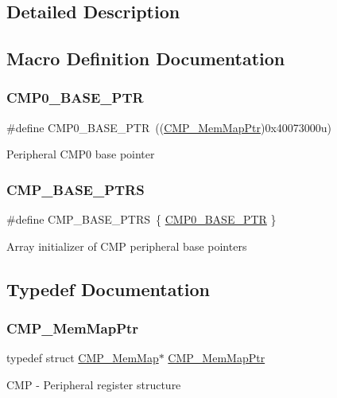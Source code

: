 \subsection{Detailed Description}


\subsection{Macro Definition Documentation}
\mbox{\label{group___c_m_p___peripheral_ga5a7a6b1d0743a05435ba5cb2dc2b3431}} 
\subsubsection{\texorpdfstring{C\+M\+P0\+\_\+\+B\+A\+S\+E\+\_\+\+P\+TR}{CMP0\_BASE\_PTR}}
{\footnotesize\ttfamily \#define C\+M\+P0\+\_\+\+B\+A\+S\+E\+\_\+\+P\+TR~((\hyperlink{group___c_m_p___peripheral_ga6f5d370df3839e41b771c2d0b89cbb83}{C\+M\+P\+\_\+\+Mem\+Map\+Ptr})0x40073000u)}

Peripheral C\+M\+P0 base pointer \mbox{\label{group___c_m_p___peripheral_gacc69654296499d45b2060956a3c8e97f}} 
\subsubsection{\texorpdfstring{C\+M\+P\+\_\+\+B\+A\+S\+E\+\_\+\+P\+T\+RS}{CMP\_BASE\_PTRS}}
{\footnotesize\ttfamily \#define C\+M\+P\+\_\+\+B\+A\+S\+E\+\_\+\+P\+T\+RS~\{ \hyperlink{group___c_m_p___peripheral_ga5a7a6b1d0743a05435ba5cb2dc2b3431}{C\+M\+P0\+\_\+\+B\+A\+S\+E\+\_\+\+P\+TR} \}}

Array initializer of C\+MP peripheral base pointers 

\subsection{Typedef Documentation}
\mbox{\label{group___c_m_p___peripheral_ga6f5d370df3839e41b771c2d0b89cbb83}} 
\subsubsection{\texorpdfstring{C\+M\+P\+\_\+\+Mem\+Map\+Ptr}{CMP\_MemMapPtr}}
{\footnotesize\ttfamily typedef struct \hyperlink{struct_c_m_p___mem_map}{C\+M\+P\+\_\+\+Mem\+Map}$\ast$ \hyperlink{group___c_m_p___peripheral_ga6f5d370df3839e41b771c2d0b89cbb83}{C\+M\+P\+\_\+\+Mem\+Map\+Ptr}}

C\+MP -\/ Peripheral register structure 